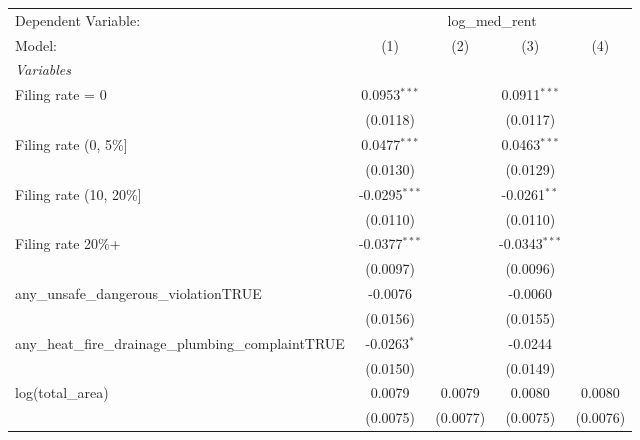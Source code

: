 \begingroup
\centering
\begin{tabular}{lcccc}
   \tabularnewline \midrule \midrule
   Dependent Variable: & \multicolumn{4}{c}{log\_med\_rent}\\
   Model:                                                  & (1)             & (2)             & (3)             & (4)\\  
   \midrule
   \emph{Variables}\\
   Filing rate = 0                                         & 0.0953$^{***}$  &                 & 0.0911$^{***}$  &   \\   
                                                           & (0.0118)        &                 & (0.0117)        &   \\   
   Filing rate (0, 5\%]                                    & 0.0477$^{***}$  &                 & 0.0463$^{***}$  &   \\   
                                                           & (0.0130)        &                 & (0.0129)        &   \\   
   Filing rate (10, 20\%]                                  & -0.0295$^{***}$ &                 & -0.0261$^{**}$  &   \\   
                                                           & (0.0110)        &                 & (0.0110)        &   \\   
   Filing rate 20\%+                                       & -0.0377$^{***}$ &                 & -0.0343$^{***}$ &   \\   
                                                           & (0.0097)        &                 & (0.0096)        &   \\   
   any\_unsafe\_dangerous\_violationTRUE                   & -0.0076         &                 & -0.0060         &   \\   
                                                           & (0.0156)        &                 & (0.0155)        &   \\   
   any\_heat\_fire\_drainage\_plumbing\_complaintTRUE      & -0.0263$^{*}$   &                 & -0.0244         &   \\   
                                                           & (0.0150)        &                 & (0.0149)        &   \\   
   log(total\_area)                                        & 0.0079          & 0.0079          & 0.0080          & 0.0080\\   
                                                           & (0.0075)        & (0.0077)        & (0.0075)        & (0.0076)\\   

\end{tabular}
